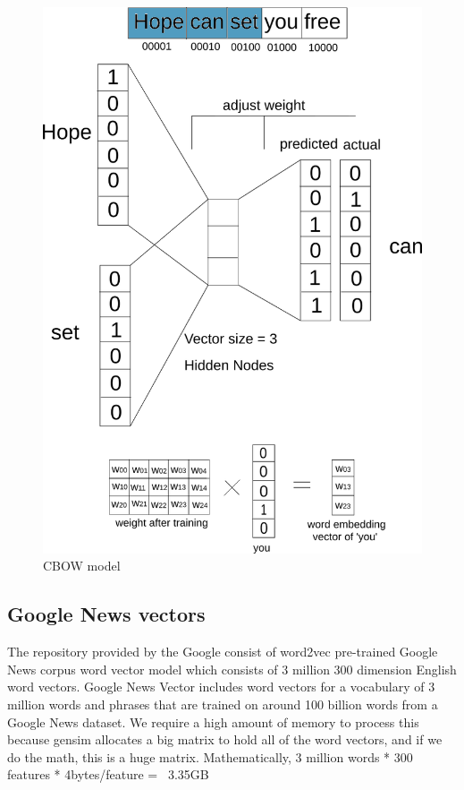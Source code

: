 \newpage
\begin{figure}[tbh]
\begin{center}
	\includegraphics[width = 4.5in]{images/cbow.png}
	\caption{CBOW model}
	\label{cbow}
\end{center}
\end{figure}

	
\subsection{Google News vectors}
	The repository provided by the Google consist of word2vec pre-trained Google News corpus word vector model which consists of 3 million 300  dimension English word vectors. Google News Vector includes word vectors for a vocabulary of 3 million words and phrases that are trained on around 100 billion words from a Google News dataset. We require a high amount of memory to process this because gensim allocates a big matrix to hold all of the word vectors, and if we do the math, this is a huge matrix. Mathematically, 3 million words * 300 features * 4bytes/feature = ~3.35GB
	

